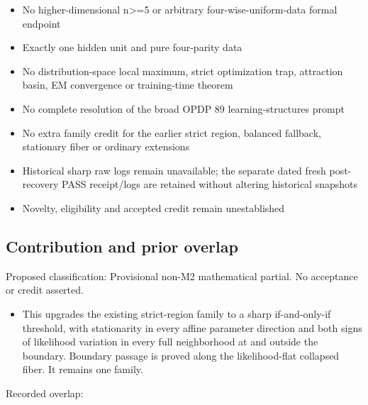 \documentclass[11pt,a4paper]{article}
\begin{document}
\begin{itemize}
\item No higher-dimensional n>=5 or arbitrary four-wise-uniform-data formal endpoint
\end{itemize}
\begin{itemize}
\item Exactly one hidden unit and pure four-parity data
\end{itemize}
\begin{itemize}
\item No distribution-space local maximum, strict optimization trap, attraction basin, EM convergence or training-time theorem
\end{itemize}
\begin{itemize}
\item No complete resolution of the broad OPDP 89 learning-structures prompt
\end{itemize}
\begin{itemize}
\item No extra family credit for the earlier strict region, balanced fallback, stationary fiber or ordinary extensions
\end{itemize}
\begin{itemize}
\item Historical sharp raw logs remain unavailable; the separate dated fresh post-recovery PASS receipt/logs are retained without altering historical snapshots
\end{itemize}
\begin{itemize}
\item Novelty, eligibility and accepted credit remain unestablished
\end{itemize}
\subsection{Contribution and prior overlap}
Proposed classification: Provisional non-M2 mathematical partial. No acceptance or credit asserted.

\begin{itemize}
\item This upgrades the existing strict-region family to a sharp if-and-only-if threshold, with stationarity in every affine parameter direction and both signs of likelihood variation in every full neighborhood at and outside the boundary. Boundary passage is proved along the likelihood-flat collapsed fiber. It remains one family.
\end{itemize}
Recorded overlap:
\end{document}
